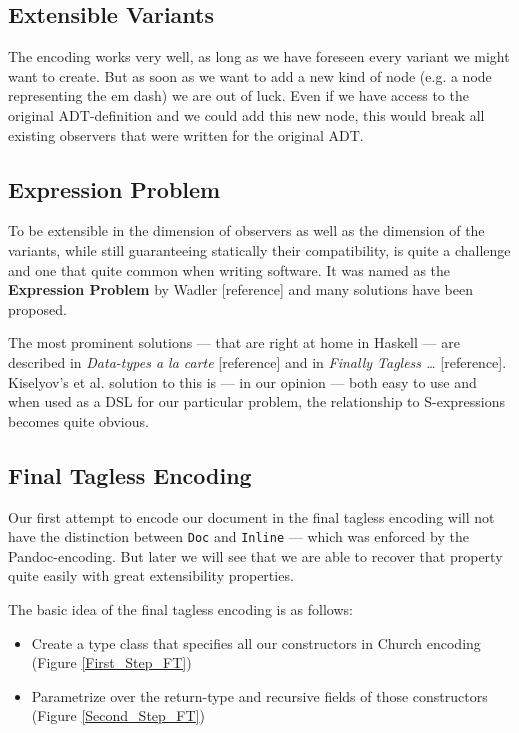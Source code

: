 \documentclass[format=acmsmall, review=true, screen=true]{acmart}
\begin{document}
\clearpage

\subsection{Extensible Variants}
\label{sec:orgccbaf12}

The encoding works very well, as long as we have foreseen every variant we might
want to create. But as soon as we want to add a new kind of node (e.g. a node
representing the em dash) we are out of luck. Even if we have access to the
original ADT-definition and we could add this new node, this would break all
existing observers that were written for the original ADT.

\subsection{Expression Problem}
\label{sec:orgb21dca4}

To be extensible in the dimension of observers as well as the dimension of the
variants, while still guaranteeing statically their compatibility, is quite a
challenge and one that quite common when writing software. It was named as the
\textbf{Expression Problem} by Wadler [reference] and many solutions have been proposed.

The most prominent solutions — that are right at home in Haskell — are described
in \emph{Data-types a la carte} [reference] and in \emph{Finally Tagless …} [reference].
Kiselyov’s et al. solution to this is — in our opinion — both easy to use and
when used as a DSL for our particular problem, the relationship to S-expressions
becomes quite obvious.


\subsection{Final Tagless Encoding}
\label{sec:org6195637}

Our first attempt to encode our document in the final tagless encoding will not
have the distinction between \texttt{Doc} and \texttt{Inline} — which was enforced by the
Pandoc-encoding. But later we will see that we are able to recover that property
quite easily with great extensibility properties.

The basic idea of the final tagless encoding is as follows:

\begin{itemize}
\item Create a type class that specifies all our constructors in Church encoding
(Figure \ref{First_Step_FT})
\item Parametrize over the return-type and recursive fields of those constructors
(Figure \ref{Second_Step_FT})
\end{itemize}
\end{document}
